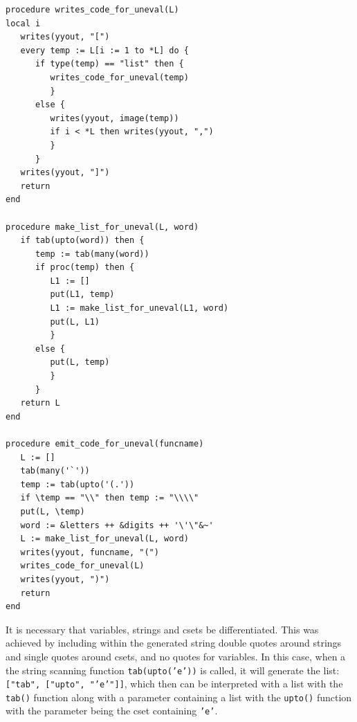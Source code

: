 \documentclass{article}
\begin{document}
\begin{verbatim}
procedure writes_code_for_uneval(L)
local i
   writes(yyout, "[")
   every temp := L[i := 1 to *L] do {
      if type(temp) == "list" then {
         writes_code_for_uneval(temp)
         } 
      else {
         writes(yyout, image(temp))
         if i < *L then writes(yyout, ",")
         }
      }
   writes(yyout, "]")
   return
end

procedure make_list_for_uneval(L, word)
   if tab(upto(word)) then {
      temp := tab(many(word))
      if proc(temp) then {
         L1 := []
         put(L1, temp)
         L1 := make_list_for_uneval(L1, word)
         put(L, L1)
         }
      else {
         put(L, temp)
         }
      }
   return L
end

procedure emit_code_for_uneval(funcname)
   L := []
   tab(many('`'))
   temp := tab(upto('(.')) 
   if \temp == "\\" then temp := "\\\\"
   put(L, \temp)
   word := &letters ++ &digits ++ '\'\"&~'
   L := make_list_for_uneval(L, word)
   writes(yyout, funcname, "(")
   writes_code_for_uneval(L)
   writes(yyout, ")")
   return
end
\end{verbatim}
It is necessary that variables, strings and csets be differentiated.  This was achieved by including within the generated string double quotes around strings and single quotes around csets, and no quotes for variables.  In this case, when a the string scanning function \texttt{tab(upto('e'))} is called, it will generate the list: \texttt{["tab", ["upto", "'e'"]]}, which then can be interpreted with a list with the \texttt{tab()} function along with a parameter containing a list with the \texttt{upto()} function with the parameter being the cset containing \texttt{'e'}.
\end{document}
